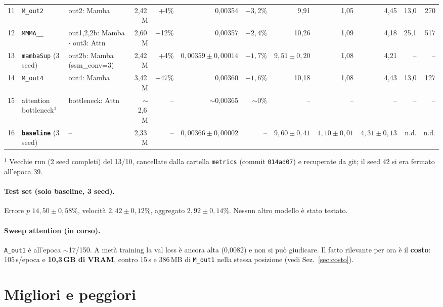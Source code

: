 \documentclass[11pt,a4paper]{article}
\newcommand{\cfg}[1]{\texttt{#1}}
\newcommand{\best}[1]{\textbf{#1}}
\begin{document}
\begin{table}[h]
{\begin{tabular}{@{}rllrrrrrrrrr@{}}
11 & \cfg{M\_out2} & out2: Mamba & 2,42\,M & +4\% & 0,00354 & $-3{,}2\%$ & 9,91 & 1,05 & 4,45 & 13,0 & 270 \\
12 & \cfg{MMMA\_\_} & out1,2,2b: Mamba $\cdot$ out3: Attn & 2,60\,M & +12\% & 0,00357 & $-2{,}4\%$ & 10,26 & 1,09 & 4,18 & 25,1 & 517 \\
13 & \cfg{mambaSup} (3 seed) & out2b: Mamba (ssm\_conv=3) & 2,42\,M & +4\% & $0{,}00359 \pm 0{,}00014$ & $-1{,}7\%$ & $9{,}51 \pm 0{,}20$ & 1,08 & 4,21 & -- & -- \\
14 & \cfg{M\_out4} & out4: Mamba & 3,42\,M & +47\% & 0,00360 & $-1{,}6\%$ & 10,18 & 1,08 & 4,43 & 13,0 & 127 \\
15 & attention bottleneck$^{1}$ & bottleneck: Attn & $\sim$2,6\,M & -- & $\sim$0,00365 & $\sim$0\% & -- & -- & -- & -- & -- \\
16 & \best{\cfg{baseline}} (3 seed) & -- & 2,33\,M & -- & $0{,}00366 \pm 0{,}00002$ & -- & $9{,}60 \pm 0{,}41$ & $1{,}10 \pm 0{,}01$ & $4{,}31 \pm 0{,}13$ & n.d. & n.d. \\
\bottomrule
\end{tabular}}

\vspace{4pt}
\begin{minipage}{\textwidth}
\footnotesize $^{1}$ Vecchie run (2 seed completi) del 13/10, cancellate dalla cartella \cfg{metrics} (commit \cfg{014ad07}) e recuperate da git; il seed 42 si era fermato all'epoca 39.
\end{minipage}
\end{table}

\paragraph{Test set (solo baseline, 3 seed).} Errore $p$ $14{,}50 \pm 0{,}58\%$, velocità $2{,}42 \pm 0{,}12\%$, aggregato $2{,}92 \pm 0{,}14\%$. Nessun altro modello è stato testato.

\paragraph{Sweep attention (in corso).} \cfg{A\_out1} è all'epoca $\sim$17/150. A metà training la val loss è ancora alta (0,0082) e non si può giudicare. Il fatto rilevante per ora è il \textbf{costo}: 105\,s/epoca e \textbf{10,3\,GB di VRAM}, contro 15\,s e 386\,MB di \cfg{M\_out1} nella stessa posizione (vedi Sez.~\ref{sec:costo}).

\section{Migliori e peggiori}
\end{document}
